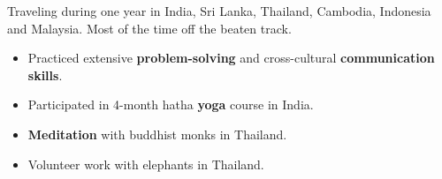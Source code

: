 \documentclass[10pt, a4paper, ragged2e]{altacv}
\begin{document}
\bigskip
{}
	
		Traveling during one year in India, Sri Lanka, Thailand, Cambodia, Indonesia and Malaysia. Most of the time off the beaten track. 
		
		\medskip
		\begin{itemize}
			\item Practiced extensive \textbf{problem-solving} and cross-cultural \textbf{communication skills}.
			\item Participated in 4-month hatha \textbf{yoga} course in India.
			\item \textbf{Meditation} with buddhist monks in Thailand.
			\item Volunteer work with elephants in Thailand.
		\end{itemize}
\end{document}
